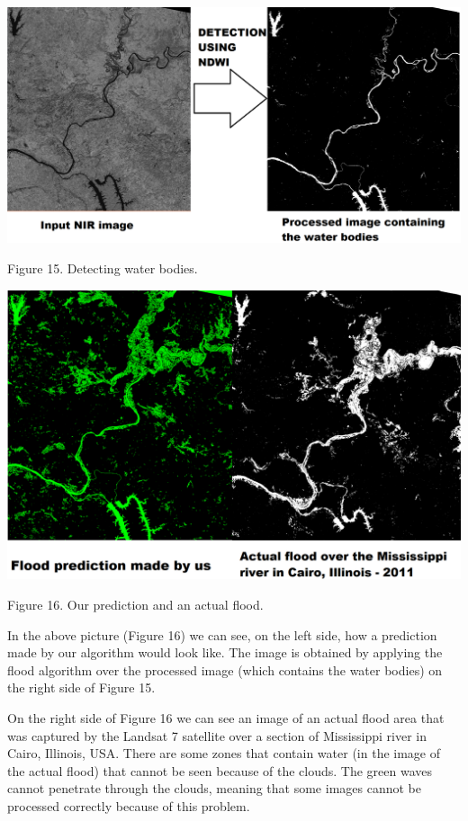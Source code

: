 \documentclass[12pt, a4paper]{report}
\begin{document}
\bigskip
\includegraphics[scale=0.3, left]{process1.png}
\begin{center}
Figure 15. Detecting water bodies.
\end{center}
\par 

\includegraphics[scale=0.4, center]{process3.png}
\begin{center}
Figure 16. Our prediction and an actual flood.
\end{center}
\par 

In the above picture (Figure 16) we can see, on the left side, how a prediction made by our algorithm would look like. The image is obtained by applying the flood algorithm over the processed image (which contains the water bodies) on the right side of Figure 15. \par 

On the right side of Figure 16 we can see an image of an actual flood area that was captured by the Landsat 7 satellite over a section of Mississippi river in Cairo, Illinois, USA. There are some zones  that contain water (in the image of the actual flood) that cannot be seen because of the clouds. The green waves cannot penetrate through the clouds, meaning that some images cannot be processed correctly because of this problem.
\par 
\end{document}
